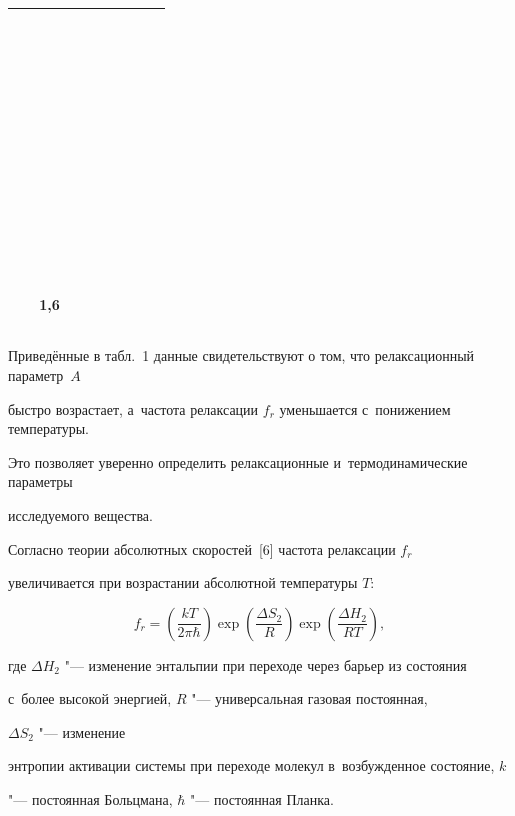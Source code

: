 \begin{table}[h!]
\begin{minipage} [t]{15.8cm}
\begin{tabular}{p{45pt}|p{45pt}|p{45pt}|p{45pt}|p{45pt}|p{45pt}|p{45pt}|p{35pt}}
{\,}\par{\,}\par{\,}\par{\,}\par

{\,}\par{\,}\par{\,}\par{\,}\par

~~~1,6  \\

\hline

\end{tabular}

\end{minipage}

\end{table}



Приведённые в табл.~1 данные свидетельствуют о том, что релаксационный параметр~$A$ 

быстро возрастает, а~частота релаксации $f_r$ уменьшается с~понижением температуры. 

Это позволяет уверенно определить релаксационные и~термодинамические параметры 

исследуемого вещества.



Согласно теории абсолютных скоростей~[6] частота релаксации $f_{r}$ 

увеличивается при возрастании абсолютной температуры $T$:

\begin{equation}

f_r =\left(\frac{kT}{2\pi \hbar}\right)

\exp \left(\frac{\Delta S_2 }R\right)

\exp \left(\frac{\Delta H_2}{RT}\right),

\end{equation}

где $\Delta H_{2}$ "--- изменение энтальпии при переходе через барьер из состояния 

с~более высокой энергией, $R$ "--- универсальная газовая постоянная, 

$\Delta S_{2} $ "--- изменение 

энтропии активации системы при переходе молекул в~возбужденное состояние, $k$

 "--- постоянная Больцмана, $\hbar$ "--- постоянная Планка. 




